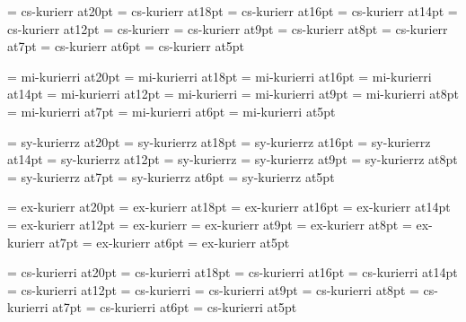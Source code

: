 

\font\twentyrm=     cs-kurierr at20pt
\font\eighteenrm=   cs-kurierr at18pt
\font\sixteenrm=    cs-kurierr at16pt
\font\fourteenrm=   cs-kurierr at14pt
\font\twelverm=     cs-kurierr at12pt
\font\tenrm=        cs-kurierr
\font\ninerm=       cs-kurierr at9pt
\font\eightrm=      cs-kurierr at8pt
\font\sevenrm=      cs-kurierr at7pt
\font\sixrm=        cs-kurierr at6pt
\font\fiverm=       cs-kurierr at5pt

\font\twentyi=      mi-kurierri at20pt
\font\eighteeni=    mi-kurierri at18pt
\font\sixteeni=     mi-kurierri at16pt
\font\fourteeni=    mi-kurierri at14pt
\font\twelvei=      mi-kurierri at12pt
\font\teni=         mi-kurierri
\font\ninei=        mi-kurierri at9pt
\font\eighti=       mi-kurierri at8pt
\font\seveni=       mi-kurierri at7pt
\font\sixi=         mi-kurierri at6pt
\font\fivei=        mi-kurierri at5pt

\font\twentysy=     sy-kurierrz at20pt
\font\eighteensy=   sy-kurierrz at18pt
\font\sixteensy=    sy-kurierrz at16pt
\font\fourteensy=   sy-kurierrz at14pt
\font\twelvesy=     sy-kurierrz at12pt
\font\tensy=        sy-kurierrz
\font\ninesy=       sy-kurierrz at9pt
\font\eightsy=      sy-kurierrz at8pt
\font\sevensy=      sy-kurierrz at7pt
\font\sixsy=        sy-kurierrz at6pt
\font\fivesy=       sy-kurierrz at5pt

\font\twentyex=     ex-kurierr at20pt
\font\eighteenex=   ex-kurierr at18pt
\font\sixteenex=    ex-kurierr at16pt
\font\fourteenex=   ex-kurierr at14pt
\font\twelveex=     ex-kurierr at12pt
\font\tenex=        ex-kurierr
\font\nineex=       ex-kurierr at9pt
\font\eightex=      ex-kurierr at8pt
\font\sevenex=      ex-kurierr at7pt
\font\sixex=        ex-kurierr at6pt
\font\fiveex=       ex-kurierr at5pt

\font\twentyit=     cs-kurierri at20pt
\font\eighteenit=   cs-kurierri at18pt
\font\sixteenit=    cs-kurierri at16pt
\font\fourteenit=   cs-kurierri at14pt
\font\twelveit=     cs-kurierri at12pt
\font\tenit=        cs-kurierri
\font\nineit=       cs-kurierri at9pt
\font\eightit=      cs-kurierri at8pt
\font\sevenit=      cs-kurierri at7pt
\font\sixit=        cs-kurierri at6pt
\font\fiveit=       cs-kurierri at5pt

